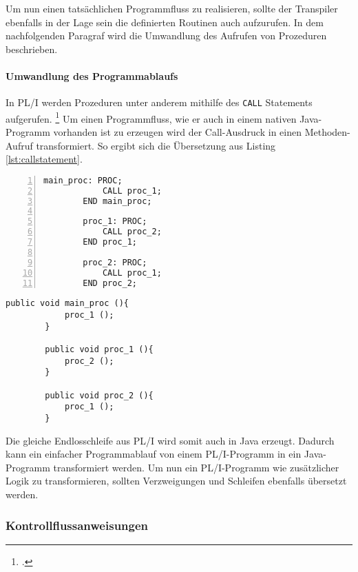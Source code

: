 Um nun einen tatsächlichen Programmfluss zu realisieren, sollte der Transpiler ebenfalls in der Lage sein die definierten Routinen auch aufzurufen.
In dem nachfolgenden Paragraf wird die Umwandlung des Aufrufen von Prozeduren beschrieben.

\paragraph{Umwandlung des Programmablaufs}

In PL/I werden Prozeduren unter anderem mithilfe des \verb+CALL+ Statements aufgerufen. \footcite[Vgl. ][S.133ff. ]{pliref} Um einen Programmfluss, wie er auch in einem nativen Java-Programm vorhanden ist zu erzeugen wird der Call-Ausdruck in einen Methoden-Aufruf transformiert. 
So ergibt sich die Übersetzung aus Listing \ref{lst:callstatement}.

\begin{minipage}[b]{0.5\linewidth}
	\centering
	\lstset{language=PL/I,label=SliceExaple}
	\begin{lstlisting}[frame=single, numbers=left, mathescape,%
		caption={Transformation des CALL-Statements}, label={lst:callstatement}]
		main_proc: PROC;
			CALL proc_1;
		END main_proc;
		
		proc_1: PROC;
			CALL proc_2;
		END proc_1;
		
		proc_2: PROC;
			CALL proc_1;
		END proc_2;
	\end{lstlisting}
\end{minipage}
\hspace{0.5cm}
\begin{minipage}[b]{0.5\linewidth}
	\centering
	\lstset{language=Java,label=SliceExaple}
	\begin{lstlisting}[frame=single, mathescape,%
		title={}]
		public void main_proc (){
			proc_1 ();
		}
		
		public void proc_1 (){
			proc_2 ();
		}
		
		public void proc_2 (){
			proc_1 ();
		}
	\end{lstlisting}
\end{minipage}


Die gleiche Endlosschleife aus PL/I wird somit auch in Java erzeugt.
Dadurch kann ein einfacher Programmablauf von einem PL/I-Programm in ein Java-Programm transformiert werden.
Um nun ein PL/I-Programm wie zusätzlicher Logik zu transformieren, sollten Verzweigungen und Schleifen ebenfalls übersetzt werden.

\pagebreak
\subsubsection{Kontrollflussanweisungen}
